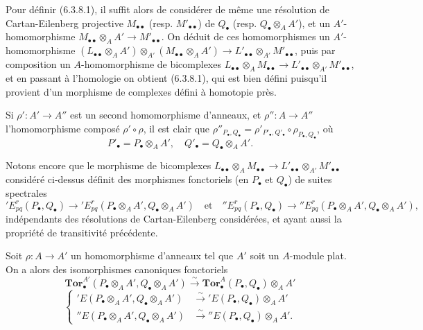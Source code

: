 \begin{env}[6.3.8]
Pour définir (6.3.8.1), il suffit alors de considérer de même une résolution
de Cartan-Eilenberg projective $M_{\bullet\bullet}$ (resp.
$M'_{\bullet\bullet}$) de $Q_\bullet$ (resp.
$Q_\bullet\otimes_A A'$), et un $A'$-homomorphisme
$M_{\bullet\bullet}\otimes_A A'\to M'_{\bullet\bullet}$. On déduit de ces
homomorphismes un $A'$-homomorphisme
$(L_{\bullet\bullet}\otimes_A A')\otimes_{A'}
(M_{\bullet\bullet}\otimes_A A')
\to
L'_{\bullet\bullet}\otimes_{A'}M'_{\bullet\bullet}$,
puis par composition un $A$-homomorphisme de bicomplexes
$L_{\bullet\bullet}\otimes_A M_{\bullet\bullet}
\to
L'_{\bullet\bullet}\otimes_{A'}M'_{\bullet\bullet}$,
et en passant à l'homologie on obtient (6.3.8.1), qui est bien défini
puisqu'il provient d'un morphisme de complexes défini à homotopie près.

Si $\rho':A'\to A''$ est un second homomorphisme d'anneaux, et
$\rho'':A\to A''$ l'homomorphisme composé $\rho'\circ\rho$, il est clair que
$\rho''_{P_\bullet,Q_\bullet}
=\rho'_{P'_\bullet,Q'_\bullet}\circ\rho_{P_\bullet,Q_\bullet}$, où
\[
  P'_\bullet=P_\bullet\otimes_A A',
  \quad Q'_\bullet=Q_\bullet\otimes_A A'.
\]

Notons encore que le morphisme de bicomplexes
$L_{\bullet\bullet}\otimes_A M_{\bullet\bullet}
\to L'_{\bullet\bullet}\otimes_{A'}M'_{\bullet\bullet}$ considéré
ci-dessus définit des morphismes fonctoriels (en $P_\bullet$ et $Q_\bullet$)
de suites spectrales
\[
  'E_{pq}^r(P_\bullet,Q_\bullet)
  \longrightarrow
  'E_{pq}^r(P_\bullet\otimes_A A',Q_\bullet\otimes_A A')
  \quad\text{et}\quad
  ''E_{pq}^r(P_\bullet,Q_\bullet)
  \longrightarrow
  ''E_{pq}^r(P_\bullet\otimes_A A',Q_\bullet\otimes_A A'),
\]
indépendants des résolutions de Cartan-Eilenberg considérées, et ayant aussi
la propriété de transitivité précédente.
\end{env}

\begin{proposition}[6.3.9]
Soit $\rho:A\to A'$ un homomorphisme d'anneaux tel que $A'$ soit un
$A$-module \textup{plat}. On a alors des isomorphismes canoniques fonctoriels
\[
  \mathbf{Tor}_\bullet^{A'}
  (P_\bullet\otimes_A A',Q_\bullet\otimes_A A')
  \xrightarrow{\sim}
  \mathbf{Tor}_\bullet^A(P_\bullet,Q_\bullet)\otimes_A A'
  \tag{6.3.9.1}\label{III.6.3.9.1.fr}
\]
\[
  \left\{
  \begin{aligned}
  'E(P_\bullet\otimes_A A',Q_\bullet\otimes_A A')
    &\xrightarrow{\sim}'E(P_\bullet,Q_\bullet)\otimes_A A'\\
  ''E(P_\bullet\otimes_A A',Q_\bullet\otimes_A A')
    &\xrightarrow{\sim}''E(P_\bullet,Q_\bullet)\otimes_A A'.
  \end{aligned}
  \right.
  \tag{6.3.9.2}\label{III.6.3.9.2.fr}
\]
\end{proposition}

